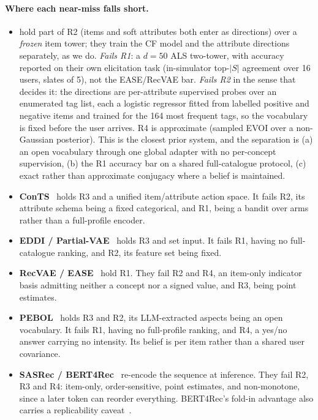 \documentclass[manuscript,screen,review]{acmart}
\begin{document}
\paragraph{Where each near-miss falls short.}
\begin{itemize}[leftmargin=1.4em,itemsep=2pt]
  \item \textbf{\citet{biyik2023soft}} hold part of R2 (items and soft attributes both enter as directions) over a \emph{frozen} item tower; they train the CF model and the attribute directions separately, as we do. \emph{Fails R1}: a $d{=}50$ ALS two-tower, with accuracy reported on their own elicitation task (in-simulator top-$|S|$ agreement over 16 users, slates of 5), not the EASE/RecVAE bar. \emph{Fails R2} in the sense that decides it: the directions are per-attribute supervised probes over an enumerated tag list, each a logistic regressor fitted from labelled positive and negative items and trained for the 164 most frequent tags, so the vocabulary is fixed before the user arrives. R4 is approximate (sampled EVOI over a non-Gaussian posterior). This is the closest prior system, and the separation is (a) an open vocabulary through one global adapter with no per-concept supervision, (b) the R1 accuracy bar on a shared full-catalogue protocol, (c) exact rather than approximate conjugacy where a belief is maintained.
  \item \textbf{ConTS}~\citep{li2021seamlessly} holds R3 and a unified item/attribute action space. It fails R2, its attribute schema being a fixed categorical, and R1, being a bandit over arms rather than a full-profile encoder.
  \item \textbf{EDDI / Partial-VAE}~\citep{ma2019eddi} holds R3 and set input. It fails R1, having no full-catalogue ranking, and R2, its feature set being fixed.
  \item \textbf{RecVAE / EASE}~\citep{ren2020recvae,steck2019ease} hold R1. They fail R2 and R4, an item-only indicator basis admitting neither a concept nor a signed value, and R3, being point estimates.
  \item \textbf{PEBOL}~\citep{austin2024bayesian} holds R3 and R2, its LLM-extracted aspects being an open vocabulary. It fails R1, having no full-profile ranking, and R4, a yes/no answer carrying no intensity. Its belief is per item rather than a shared user covariance.
  \item \textbf{SASRec / BERT4Rec}~\citep{kang2018sasrec,sun2019bert4rec} re-encode the sequence at inference. They fail R2, R3 and R4: item-only, order-sensitive, point estimates, and non-monotone, since a later token can reorder everything. BERT4Rec's fold-in advantage also carries a replicability caveat~\citep{petrov2022replicability}.
\end{itemize}
\end{document}
